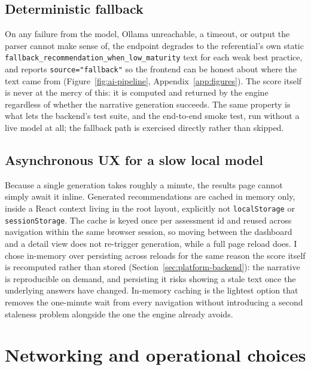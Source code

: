 \subsection{Deterministic fallback}

On any failure from the model, Ollama unreachable, a timeout, or output the parser cannot make sense of, the endpoint degrades to the referential's own static \texttt{fallback\_\allowbreak recommendation\_\allowbreak when\_\allowbreak low\_\allowbreak maturity} text for each weak best practice, and reports \texttt{source="fallback"} so the frontend can be honest about where the text came from (Figure~\ref{fig:ai-pipeline}, Appendix~\ref{app:figures}). The score itself is never at the mercy of this: it is computed and returned by the engine regardless of whether the narrative generation succeeds. The same property is what lets the backend's test suite, and the end-to-end smoke test, run without a live model at all; the fallback path is exercised directly rather than skipped.



\subsection{Asynchronous UX for a slow local model}

Because a single generation takes roughly a minute, the results page cannot simply await it inline. Generated recommendations are cached in memory only, inside a React context living in the root layout, explicitly not \texttt{local\allowbreak Storage} or \texttt{session\allowbreak Storage}. The cache is keyed once per assessment id and reused across navigation within the same browser session, so moving between the dashboard and a detail view does not re-trigger generation, while a full page reload does. I chose in-memory over persisting across reloads for the same reason the score itself is recomputed rather than stored (Section~\ref{sec:platform-backend}): the narrative is reproducible on demand, and persisting it risks showing a stale text once the underlying answers have changed. In-memory caching is the lightest option that removes the one-minute wait from every navigation without introducing a second staleness problem alongside the one the engine already avoids.

\section{Networking and operational choices}
\label{sec:platform-networking}

